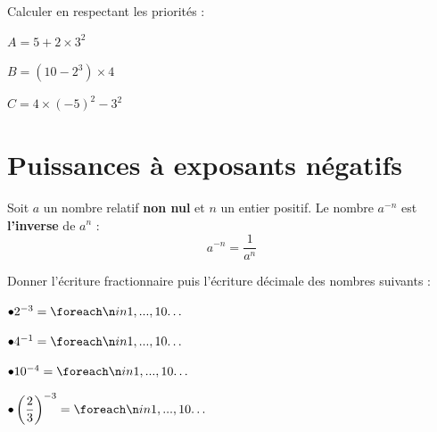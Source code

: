 \documentclass[a4paper]{book}
\begin{document}
    \begin{exemple}
        Calculer en respectant les priorités :
        
        \begin{minipage}{0.30\linewidth}
            $A = 5 + 2 \times 3^2$

            \vspace{3cm}
        \end{minipage}
        \hfill \vline \hfill
        \begin{minipage}{0.30\linewidth}
            $B = (10 - 2^3) \times 4$

            \vspace{3cm}
        \end{minipage}     
        \hfill \vline \hfill
        \begin{minipage}{0.30\linewidth}
             $C = 4 \times (-5)^2 - 3^2$ 

             \vspace{3cm}
        \end{minipage}     
    \end{exemple}
    

\section{Puissances à exposants négatifs}

    \begin{definition}
        Soit $a$ un nombre relatif \textbf{non nul} et $n$ un entier positif.
        Le nombre $a^{-n}$ est \textbf{l'inverse} de $a^n$ :
        $$a^{-n} = \frac{1}{a^n}$$
    \end{definition}
    
    
    \begin{exemple}
        Donner l'écriture fractionnaire puis l'écriture décimale des nombres suivants :

        \medskip
    
        \begin{minipage}{0.5\linewidth}
            $\bullet 2^{-3} = \points[10]$

            \bigskip

            $\bullet 4^{-1} = \points[10]$
        \end{minipage}
        \hfill
        \begin{minipage}{0.49\linewidth}
            $\bullet 10^{-4} = \points[10]$

            \bigskip

            $\bullet \left(\dfrac{2}{3}\right)^{-3} = \points[10]$
        \end{minipage}
    \end{exemple}
\end{document}
